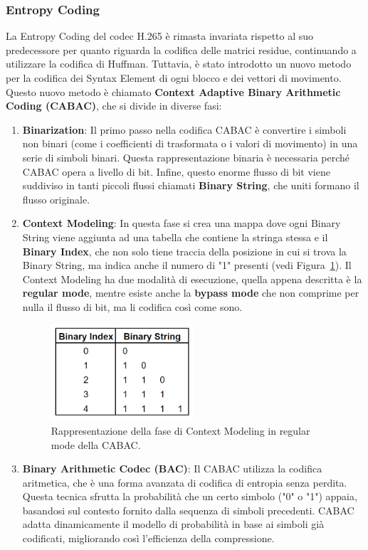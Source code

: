 \documentclass[a4paper,12pt, oneside]{article}
\begin{document}
\subsubsection{Entropy Coding}
La Entropy Coding del codec H.265 è rimasta invariata rispetto al suo predecessore per quanto riguarda
la codifica delle matrici residue, continuando a utilizzare la codifica di Huffman. Tuttavia, è stato
introdotto un nuovo metodo per la codifica dei Syntax Element di ogni blocco e dei vettori di movimento.
Questo nuovo metodo è chiamato \textbf{Context Adaptive Binary Arithmetic Coding (CABAC)}, che si divide
in diverse fasi:

\begin{enumerate}
    \item \textbf{Binarization}: Il primo passo nella codifica CABAC è convertire i simboli
    non binari (come i coefficienti di trasformata o i valori di movimento) in una serie di simboli binari.
    Questa rappresentazione binaria è necessaria perché CABAC opera a livello di bit. Infine, questo enorme
    flusso di bit viene suddiviso in tanti piccoli flussi chiamati \textbf{Binary String}, che uniti formano
    il flusso originale.
    \item \textbf{Context Modeling}: In questa fase si crea una mappa dove ogni Binary String viene
    aggiunta ad una tabella che contiene la stringa stessa e il \textbf{Binary Index}, che non solo
    tiene traccia della posizione in cui si trova la Binary String, ma indica anche il numero di "1"
    presenti (vedi Figura~\ref{fig:CABAC_regular}). Il Context Modeling ha due modalità di esecuzione,
    quella appena descritta è la \textbf{regular mode}, mentre esiste anche la \textbf{bypass mode}
    che non comprime per nulla il flusso di bit, ma li codifica così come sono.
    
    \begin{figure}[h]
        \centering
        \includegraphics[width=0.5\textwidth]{images/CABAC-regular.png}
        \caption{Rappresentazione della fase di Context Modeling in regular mode della CABAC.}
        \label{fig:CABAC_regular}
    \end{figure}
    
    \item \textbf{Binary Arithmetic Codec (BAC)}: Il CABAC utilizza la codifica aritmetica, che è una forma
    avanzata di codifica di entropia senza perdita. Questa tecnica sfrutta la probabilità che un certo simbolo
    ("0" o "1") appaia, basandosi sul contesto fornito dalla sequenza di simboli precedenti. CABAC adatta
    dinamicamente il modello di probabilità in base ai simboli già codificati, migliorando così l'efficienza
    della compressione.
\end{enumerate}
\end{document}
